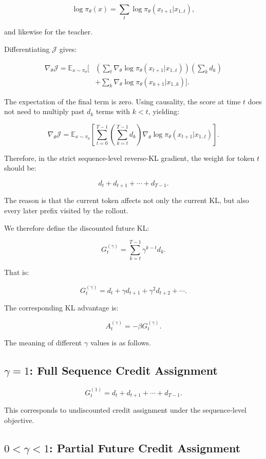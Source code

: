 \documentclass[11pt,a4paper]{article}
\begin{document}
\[
\log\pi_\theta(x)
=
\sum_t\log\pi_\theta(x_{t+1}|x_{1..t}),
\]

and likewise for the teacher.

Differentiating $\mathcal J$ gives:

\[
\begin{aligned}
\nabla_\theta\mathcal J
=
\mathbb E_{x\sim\pi_\theta}
\Bigg[
&\left(\sum_t\nabla_\theta
\log\pi_\theta(x_{t+1}|x_{1..t})\right)
\left(\sum_k d_k\right)\\
&+\sum_k
\nabla_\theta\log\pi_\theta(x_{k+1}|x_{1..k})
\Bigg].
\end{aligned}
\]

The expectation of the final term is zero. Using causality, the score at time $t$ does not need to multiply past $d_k$ terms with $k<t$, yielding:

\[
\boxed{
\nabla_\theta\mathcal J
=
\mathbb E_{x\sim\pi_\theta}
\left[
\sum_{t=0}^{T-1}
\left(\sum_{k=t}^{T-1}d_k\right)
\nabla_\theta\log\pi_\theta(x_{t+1}|x_{1..t})
\right].
}
\]

Therefore, in the strict sequence-level reverse-KL gradient, the weight for token $t$ should be:

\[
d_t+d_{t+1}+\cdots+d_{T-1}.
\]

The reason is that the current token affects not only the current KL, but also every later prefix visited by the rollout.

We therefore define the discounted future KL:

\[
G_t^{(\gamma)}
=
\sum_{k=t}^{T-1}\gamma^{k-t}d_k.
\]

That is:

\[
G_t^{(\gamma)}
=
d_t+\gamma d_{t+1}+\gamma^2d_{t+2}+\cdots.
\]

The corresponding KL advantage is:

\[
A_t^{(\gamma)}=-\beta G_t^{(\gamma)}.
\]

The meaning of different $\gamma$ values is as follows.

\subsection{\texorpdfstring{$\gamma=1$}{gamma=1}: Full Sequence Credit Assignment}

\[
G_t^{(1)}=d_t+d_{t+1}+\cdots+d_{T-1}.
\]

This corresponds to undiscounted credit assignment under the sequence-level objective.

\subsection{\texorpdfstring{$0<\gamma<1$}{0<gamma<1}: Partial Future Credit Assignment}
\end{document}
